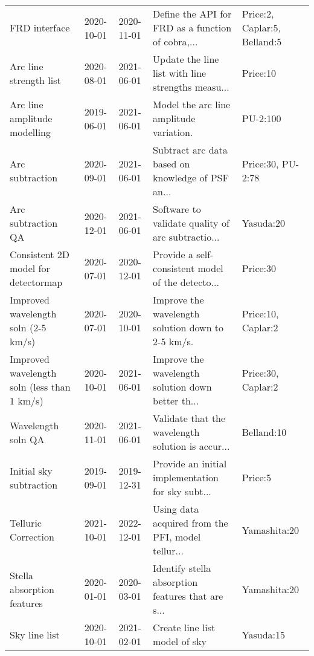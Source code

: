 \begin{longtable}{p{2cm}llp{2cm}l}
                               FRD interface &  2020-10-01 &  2020-11-01 &  Define the API for FRD as a function of cobra,... &  Price:2, Caplar:5, Belland:5 \\
                      Arc line strength list &  2020-08-01 &  2021-06-01 &  Update the line list with line strengths measu... &                      Price:10 \\
                Arc line amplitude modelling &  2019-06-01 &  2021-06-01 &            Model the arc line amplitude variation. &                      PU-2:100 \\
                             Arc subtraction &  2020-09-01 &  2021-06-01 &  Subtract arc data based on knowledge of PSF an... &             Price:30, PU-2:78 \\
                          Arc subtraction QA &  2020-12-01 &  2021-06-01 &  Software to validate quality of arc subtractio... &                     Yasuda:20 \\
         Consistent 2D model for detectormap &  2020-07-01 &  2020-12-01 &  Provide a self-consistent model of the detecto... &                      Price:30 \\
         Improved wavelength soln (2-5 km/s) &  2020-07-01 &  2020-10-01 &  Improve the wavelength solution down to 2-5 km/s. &            Price:10, Caplar:2 \\
 Improved wavelength soln (less than 1 km/s) &  2020-10-01 &  2021-06-01 &  Improve the wavelength solution down better th... &            Price:30, Caplar:2 \\
                          Wavelength soln QA &  2020-11-01 &  2021-06-01 &  Validate that the wavelength solution is accur... &                    Belland:10 \\
                     Initial sky subtraction &  2019-09-01 &  2019-12-31 &  Provide an initial implementation for sky subt... &                       Price:5 \\
                         Telluric Correction &  2021-10-01 &  2022-12-01 &  Using data acquired from the PFI, model tellur... &                  Yamashita:20 \\
                  Stella absorption features &  2020-01-01 &  2020-03-01 &  Identify stella absorption features that are s... &                  Yamashita:20 \\
                               Sky line list &  2020-10-01 &  2021-02-01 &                      Create line list model of sky &                     Yasuda:15 \\

\end{longtable}
